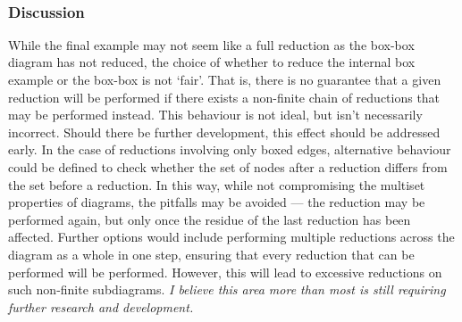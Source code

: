 \begin{examples}{~\\}
\begin{figure}[H]
\begin{subfigure}{0.4\linewidth}
                \end{subfigure}
            \end{figure}
        \end{examples}


    \subsubsection{Discussion}
        While the final example may not seem like a full reduction as the box-box diagram has not reduced, the choice of whether to reduce the internal box example or the box-box is not `fair'.
        That is, there is no guarantee that a given reduction will be performed if there exists a non-finite chain of reductions that may be performed instead.
        This behaviour is not ideal, but isn't necessarily incorrect.
        Should there be further development, this effect should be addressed early.
        In the case of reductions involving only boxed edges, alternative behaviour could be defined to check whether the set of nodes after a reduction differs from the set before a reduction.
        In this way, while not compromising the multiset properties of diagrams, the pitfalls may be avoided --- the reduction may be performed again, but only once the residue of the last reduction has been affected.\footnotemark
        Further options would include performing multiple reductions across the diagram as a whole in one step, ensuring that every reduction that can be performed will be performed.
        However, this will lead to excessive reductions on such non-finite subdiagrams.
        \textit{I believe this area more than most is still requiring further research and development.}\\

